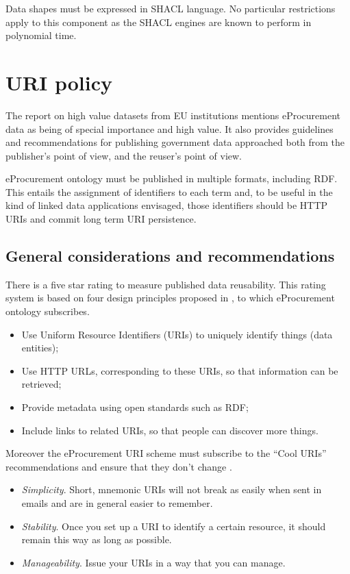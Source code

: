 	Data shapes must be expressed in SHACL language. No particular restrictions apply to this component as the SHACL engines are known to perform in polynomial time. 
	
\section{URI policy}
\label{sec:uri-policy}

	The report on high value datasets from EU institutions \citep{d-high-value-assets} mentions eProcurement data as being of special importance and high value. It also provides guidelines and recommendations for  publishing government data approached both from the publisher's point of view, and the reuser's point of view. 
	
	eProcurement ontology must be published in multiple formats, including RDF. This entails the assignment of identifiers to each term and, to be useful in the kind of linked data applications envisaged, those identifiers should be HTTP URIs and commit long term URI persistence.
	
	\subsection{General considerations and recommendations}
	\label{sec:considerations}
	There is a five star rating \cite{berners5star} to measure published data reusability. This rating system is based on four design principles proposed in \citep{berners2006linked}, to which eProcurement ontology subscribes.
	
	\begin{itemize}
		\item Use Uniform Resource Identifiers (URIs) to uniquely identify
		things (data entities);
		\item Use HTTP URLs, corresponding to these URIs, so that
		information can be retrieved;
		\item Provide metadata using open standards such as RDF;
		\item Include links to related URIs, so that people can discover more
		things.		
	\end{itemize} 
	
	Moreover the eProcurement URI scheme must subscribe to the ``Cool URIs'' recommendations \cite{cool-uri-cyganiak} and ensure that they don't change \cite{burners1998cool}. 
	
	\begin{itemize}
		\item \textit{Simplicity}. Short, mnemonic URIs will not break as easily when sent in emails and are in general easier to remember.
		\item \textit{Stability}. Once you set up a URI to identify a certain resource, it should remain this way as long as possible.
		\item  \textit{Manageability}. Issue your URIs in a way that you can manage. \cite{cool-uri-cyganiak}
	\end{itemize}

